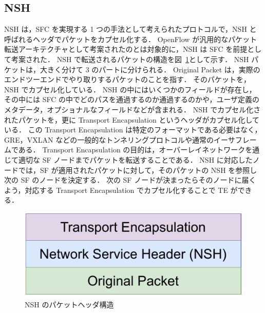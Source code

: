 \subsection{NSH}
\label{sbsection:nsh}
NSH は，SFC を実現する 1 つの手法として考えられたプロトコルで，NSH と呼ばれるヘッダでパケットをカプセル化する．
OpenFlow が汎用的なパケット転送アーキテクチャとして考案されたのとは対象的に，NSH は SFC を前提として考案された．
NSH で転送されるパケットの構造を図~\ref*{fig:nsh}として示す．
NSH パケットは，大きく分けて 3 のパートに分けられる．
Original Packet は，実際のエンドツーエンドでやり取りするパケットのことを指す．
そのパケットを，NSH でカプセル化している．
NSH の中にはいくつかのフィールドが存在し，その中には SFC の中でどのパスを通過するのか通過するのかや，ユーザ定義のメタデータ，オプショナルなフィールドなどが含まれる．
NSH でカプセル化されたパケットを，更に Transport Encapsulation というヘッダがカプセル化している．
この Transport Encapsulation は特定のフォーマットである必要はなく，GRE，VXLAN などの一般的なトンネリングプロトコルや通常のイーサフレームである．
Transport Encapsulation の目的は，オーバーレイネットワークを通じて適切な SF ノードまでパケットを転送することである．
NSH に対応したノードでは，SF が適用されたパケットに対して，そのパケットの NSH を参照し次の SF のノードを決定する．
次の SF ノードが決まったらそのノードに届くよう，対応する Transport Encapsulation でカプセル化することで TE ができる．
\begin{figure}[t]
    \centering
    \includegraphics[width=0.95\linewidth]{img/nsh.pdf}
    \caption{NSH のパケットヘッダ構造}
    \label{fig:nsh}
\end{figure}


